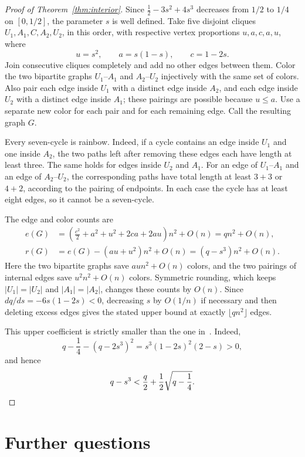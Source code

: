 \documentclass[10pt]{article}
\theoremstyle{remark}
\begin{document}
\begin{proof}[Proof of Theorem~\ref{thm:interior}]
Since $\frac12-3s^2+4s^3$ decreases from $1/2$ to $1/4$ on $[0,1/2]$, the parameter $s$ is well defined. Take five disjoint cliques $U_1,A_1,C,A_2,U_2$, in this order, with respective vertex proportions $u,a,c,a,u$, where
\[
 u=s^2,\qquad a=s(1-s),\qquad c=1-2s.
\]
Join consecutive cliques completely and add no other edges between them. Color the two bipartite graphs $U_1$--$A_1$ and $A_2$--$U_2$ injectively with the same set of colors. Also pair each edge inside $U_1$ with a distinct edge inside $A_2$, and each edge inside $U_2$ with a distinct edge inside $A_1$; these pairings are possible because $u\le a$. Use a separate new color for each pair and for each remaining edge. Call the resulting graph $G$.

Every seven-cycle is rainbow. Indeed, if a cycle contains an edge inside $U_1$ and one inside $A_2$, the two paths left after removing these edges each have length at least three. The same holds for edges inside $U_2$ and $A_1$. For an edge of $U_1$--$A_1$ and an edge of $A_2$--$U_2$, the corresponding paths have total length at least $3+3$ or $4+2$, according to the pairing of endpoints. In each case the cycle has at least eight edges, so it cannot be a seven-cycle.

The edge and color counts are
\[
 \begin{aligned}
 e(G)&=\left(\frac{c^2}{2}+a^2+u^2+2ca+2au\right)n^2+O(n)
       =qn^2+O(n),\\
 r(G)&=e(G)-(au+u^2)n^2+O(n)
       =(q-s^3)n^2+O(n).
 \end{aligned}
\]
Here the two bipartite graphs save $au n^2+O(n)$ colors, and the two pairings of internal edges save $u^2n^2+O(n)$ colors. Symmetric rounding, which keeps $|U_1|=|U_2|$ and $|A_1|=|A_2|$, changes these counts by $O(n)$. Since $dq/ds=-6s(1-2s)<0$, decreasing $s$ by $O(1/n)$ if necessary and then deleting excess edges gives the stated upper bound at exactly $\lfloor qn^2\rfloor$ edges.

This upper coefficient is strictly smaller than the one in~\cite{BCM}. Indeed,
\[
 q-\frac14-(q-2s^3)^2=s^3(1-2s)^2(2-s)>0,
\]
and hence
\[
 q-s^3<\frac q2+\frac12\sqrt{q-\frac14}.\qedhere
\]
\end{proof}

\section{Further questions}\label{sec:questions}
\end{document}
